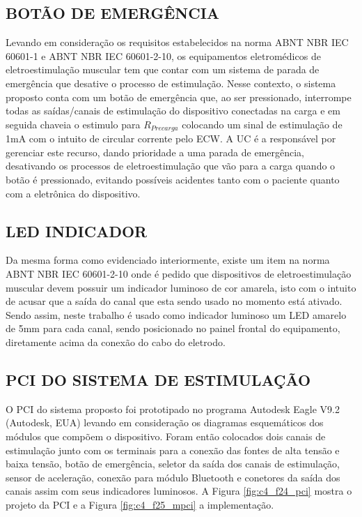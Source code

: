 \subsection{BOTÃO DE EMERGÊNCIA} 
Levando em consideração os requisitos estabelecidos na norma \acrshort{ABNT} \acrshort{NBR} \acrshort{IEC} 60601-1 e \acrshort{ABNT} \acrshort{NBR} \acrshort{IEC} 60601-2-10, os equipamentos eletromédicos de eletroestimulação muscular tem que contar com um sistema de parada de emergência que desative o processo de estimulação. Nesse contexto, o sistema proposto conta com um botão de emergência que, ao ser pressionado, interrompe todas as saídas/canais de estimulação do dispositivo conectadas na carga e em seguida chaveia o estimulo para $R_{Precarga}$ colocando um sinal de estimulação de 1mA com o intuito de circular corrente pelo \acrshort{ECW}. 
A \acrshort{UC} é a responsável por gerenciar este recurso, dando prioridade a uma parada de emergência, desativando os processos de eletroestimulação que vão para a carga quando o botão é pressionado, evitando possíveis acidentes tanto com o paciente quanto com a eletrônica do dispositivo.

\subsection{LED INDICADOR}
Da mesma forma como evidenciado interiormente, existe um item na norma \acrshort{ABNT} \acrshort{NBR} \acrshort{IEC} 60601-2-10 onde é pedido que dispositivos de eletroestimulação muscular devem possuir um indicador luminoso  de cor amarela, isto com o intuito de acusar que a saída do canal que esta sendo usado no momento está ativado. Sendo assim, neste trabalho é usado como indicador luminoso um \acrshort{LED} amarelo de 5mm para cada canal, sendo posicionado no painel frontal do equipamento, diretamente acima da conexão do cabo do eletrodo.


\subsection{PCI DO SISTEMA DE ESTIMULAÇÃO}
O \acrshort{PCI} do sistema proposto foi prototipado no programa Autodesk Eagle V9.2 (Autodesk\@, EUA) levando em consideração os diagramas esquemáticos dos módulos que compõem o dispositivo. Foram então colocados dois canais de estimulação junto com os terminais para a conexão das fontes de alta tensão e baixa tensão, botão de emergência, seletor da saída dos canais de estimulação, sensor de aceleração, conexão para módulo Bluetooth e conetores da saída dos canais assim com seus indicadores luminosos. A Figura \ref{fig:c4_f24_pci} mostra o projeto da \acrshort{PCI} e a Figura \ref{fig:c4_f25_mpci} a implementação.


